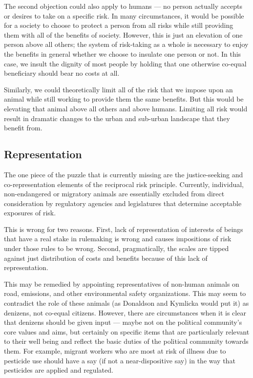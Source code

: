 The second objection could also apply to humans --- no person actually accepts
or desires to take on a specific risk. In many circumstances, it would be
possible for a society to choose to protect a person from all risks while still
providing them with all of the benefits of society. However, this is just an
elevation of one person above all others; the system of risk-taking as a whole
is necessary to enjoy the benefits in general whether we choose to insulate one
person or not. In this case, we insult the dignity of most people by holding
that one otherwise co-equal beneficiary should bear no costs at all.

Similarly, we could theoretically limit all of the risk that we impose upon an
animal while still working to provide them the same benefits. But this would be
elevating that animal above all others and above humans. Limiting all risk
would result in dramatic changes to the urban and sub-urban landscape that they
benefit from.

\subsection{Representation}

The one piece of the puzzle that is currently missing are the justice-seeking
and co-representation elements of the reciprocal risk principle. Currently,
individual, non-endangered or migratory animals are essentially excluded from
direct consideration by regulatory agencies and legislatures that determine
acceptable exposures of risk.

This is wrong for two reasons. First, lack of representation of interests of
beings that have a real stake in rulemaking is wrong and causes impositions of
risk under those rules to be wrong. Second, pragmatically, the scales are
tipped against just distribution of costs and benefits because of this lack of
representation.

This may be remedied by appointing representatives of non-human animals on
road, emissions, and other environmental safety organizations. This may seem to
contradict the role of these animals (as Donaldson and Kymlicka would put it)
as denizens, not co-equal citizens. However, there are circumstances when it is
clear that denizens should be given input --- maybe not on the political
community’s core values and aims, but certainly on specific items that are
particularly relevant to their well being and reflect the basic duties of the
political community towards them. For example, migrant workers who are most at
risk of illness due to pesticide use should have a say (if not a
near-dispositive say) in the way that pesticides are applied and regulated.

